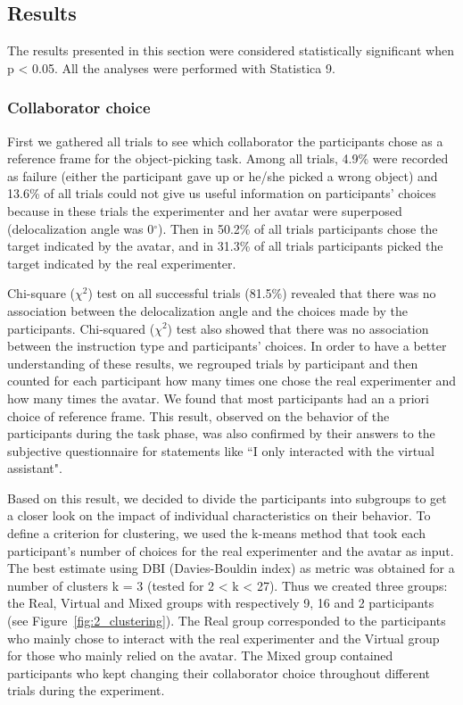 \subsection{Results}
The results presented in this section were considered statistically significant when p \textless{} 0.05. All the analyses were performed with Statistica 9.

\subsubsection{Collaborator choice}
First we gathered all trials to see which collaborator the participants chose as a reference frame for the object-picking task. Among all trials, 4.9\% were recorded as failure (either the participant gave up or he/she picked a wrong object) and 13.6\% of all trials could not give us useful information on participants' choices because in these trials the experimenter and her avatar were superposed (delocalization angle was 0$^\circ$). Then in 50.2\% of all trials participants chose the target indicated by the avatar, and in 31.3\% of all trials participants picked the target indicated by the real experimenter.

Chi-square ($\chi^2$) test on all successful trials (81.5\%) revealed that there was no association between the delocalization angle and the choices made by the participants. Chi-squared ($\chi^2$) test also showed that there was no association between the instruction type and participants' choices. In order to have a better understanding of these results, we regrouped trials by participant and then counted for each participant how many times one chose the real experimenter and how many times the avatar. We found that most participants had an a priori choice of reference frame. This result, observed on the behavior of the participants during the task phase, was also confirmed by their answers to the subjective questionnaire for statements like ``I only interacted with the virtual assistant".

Based on this result, we decided to divide the participants into subgroups to get a closer look on the impact of individual characteristics on their behavior. To define a criterion for clustering, we used the k-means method that took each participant's number of choices for the real experimenter and the avatar as input. The best estimate using DBI (Davies-Bouldin index) as metric was obtained for a number of clusters k = 3 (tested for 2 \textless{} k \textless{} 27). Thus we created three groups: the Real, Virtual and Mixed groups with respectively 9, 16 and 2 participants (see Figure~\ref{fig:2_clustering}). The Real group corresponded to the participants who mainly chose to interact with the real experimenter and the Virtual group for those who mainly relied on the avatar. The Mixed group contained participants who kept changing their collaborator choice throughout different trials during the experiment.

